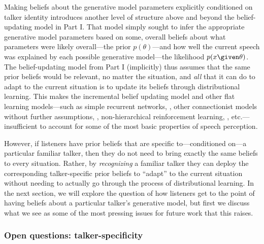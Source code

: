\label{r2-talker-spec-novelty}
Making beliefs about the generative model parameters explicitly conditioned on talker identity introduces another level of structure above and beyond the belief-updating model in Part I.  That model simply sought to infer the appropriate generative model parameters based on some, overall beliefs about what parameters were likely overall---the prior $p(\theta)$---and how well the current speech was explained by each possible generative model---the likelihood $p(x \given \theta)$.  The belief-updating model from Part I (implicitly) thus assumes that the same prior beliefs would be relevant, no matter the situation, and \emph{all} that it can do to adapt to the current situation is to update its beliefs through distributional learning.  This makes the incremental belief updating model and other flat learning models---such as simple recurrent networks, \autocite{Chang2006,Elman1990}, other connectionist models without further assumptions, \autocite{Mirman2006,Lancia2013}, non-hierarchical reinforcement learning, \autocite{Gallistel2001}, etc.---insufficient to account for some of the most basic properties of speech perception.

However, if listeners have prior beliefs that are specific to---conditioned on---a particular familiar talker, then they do not need to bring exactly the same beliefs to every situation.  Rather, by \emph{recognizing} a familiar talker they can deploy the corresponding talker-specific prior beliefs to ``adapt'' to the current situation without needing to actually go through the process of distributional learning.  In the next section, we will explore the question of how listeners get to the point of having beliefs about a particular talker's generative model, but first we discuss what we see as some of the most pressing issues for future work that this raises.

\subsubsection{Open questions: talker-specificity}
\label{sec:open-quest-talk}

